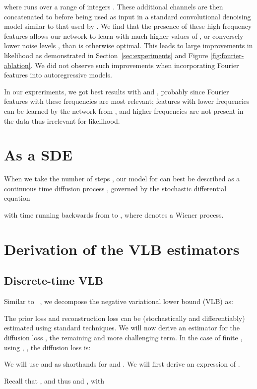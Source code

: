 \documentclass{article}
\begin{document}
where  runs over a range of integers . These additional channels are then concatenated to  before being used as input in a standard convolutional denoising model similar to that used by \citet{ho2020denoising}. We find that the presence of these high frequency features allows our network to learn with much higher values of , or conversely lower noise levels , than is otherwise optimal. This leads to large improvements in likelihood as demonstrated in Section~\ref{sec:experiments} and Figure \ref{fig:fourier-ablation}. We did not observe such improvements when incorporating Fourier features into autoregressive models.

In our expreriments, we got best results with  and , probably since Fourier features with these frequencies are most relevant; features with lower frequencies can be learned by the network from , and higher frequencies are not present in the data thus irrelevant for likelihood.

\section{As a SDE}
\label{sec:sde}
When we take the number of steps , our model for  can best be described as a continuous time diffusion process \citep{song2020score}, governed by the stochastic differential equation

with time running backwards from  to , where  denotes a Wiener process.




\section{Derivation of the VLB estimators}
\label{sec:objective}

\subsection{Discrete-time VLB}
Similar to ~\citep{sohl2015deep}, we decompose the negative variational lower bound (VLB) as:

The prior loss and reconstruction loss can be (stochastically and differentiably) estimated using standard techniques. We will now derive an estimator for the diffusion loss , the remaining and more challenging term. In the case of finite , using , , the diffusion loss is:

We will use  and  as shorthands for  and . We will first derive an expression of .

Recall that , and thus  and , with
\end{document}
